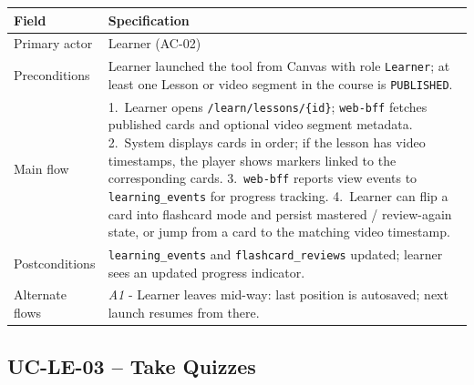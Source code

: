 \begin{longtable}{|p{3.2cm}|p{10.3cm}|}
\hline
\textbf{Field} & \textbf{Specification} \\
\hline
\endhead
Primary actor & Learner (AC-02) \\
\hline
Preconditions & Learner launched the tool from Canvas with role
    \texttt{Learner}; at least one Lesson or video segment in the course
    is \texttt{PUBLISHED}. \\
\hline
Main flow &
    1.\ Learner opens \texttt{/learn/lessons/\{id\}}; \texttt{web-bff}
    fetches published cards and optional video segment metadata.
    2.\ System displays cards in order; if the lesson has video
    timestamps, the player shows markers linked to the corresponding
    cards.
    3.\ \texttt{web-bff} reports view events to
    \texttt{learning\_events} for progress tracking.
    4.\ Learner can flip a card into flashcard mode and persist
    mastered / review-again state, or jump from a card to the matching
    video timestamp. \\
\hline
Postconditions & \texttt{learning\_events} and
    \texttt{flashcard\_reviews} updated; learner sees an updated
    progress indicator. \\
\hline
Alternate flows &
    \emph{A1} - Learner leaves mid-way: last position is autosaved;
    next launch resumes from there. \\
\hline
\end{longtable}

\subsection*{UC-LE-03 -- Take Quizzes}

